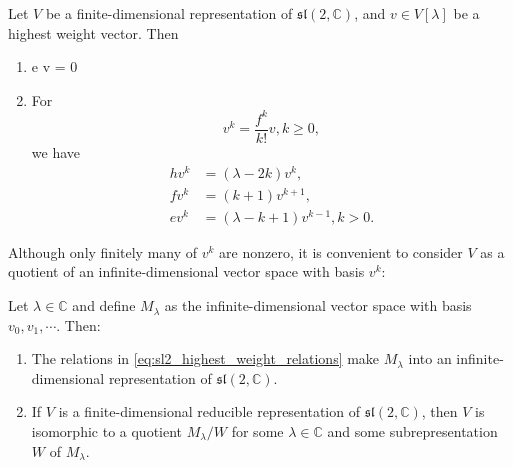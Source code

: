 \documentclass{report}
\begin{document}
\begin{lemma}
    Let $V$ be a finite-dimensional representation of $\mathfrak{sl}(2, \mathbb C)$, and $v \in V[\lambda]$ be a highest weight vector. Then
    \begin{enumerate}[label = (\roman*)]
        \item e v = 0\\
        \item For 
        \[
        v^k = \frac{f^k}{k!} v, k \geq 0,
        \]
        we have
        \begin{align}\label{eq:sl2_highest_weight_relations}
            h v^k &= (\lambda - 2k) v^k,\\
            f v^k &= (k+1) v^{k+1},\\
            e v^k &= (\lambda - k + 1) v^{k-1}, k > 0.           
        \end{align}
    \end{enumerate}
\end{lemma}
Although only finitely many of $v^k$ are nonzero, it is convenient to consider $V$ as a quotient of an infinite-dimensional vector space with basis $v^k$:
\begin{lemma}
    Let $\lambda \in \mathbb C$ and define $M_\lambda$ as the infinite-dimensional vector space with basis $v_0, v_1, \cdots$. Then:
    \begin{enumerate}[label = (\roman*)]
        \item The relations in \cref{eq:sl2_highest_weight_relations} make $M_\lambda$ into an infinite-dimensional representation of $\mathfrak{sl}(2, \mathbb C)$.
        \item If $V$ is a finite-dimensional reducible representation of $\mathfrak{sl}(2, \mathbb C)$, then $V$ is isomorphic to a quotient $M_\lambda / W$ for some $\lambda \in \mathbb C$ and some subrepresentation $W$ of $M_\lambda$.
    \end{enumerate}
\end{lemma}
\end{document}
